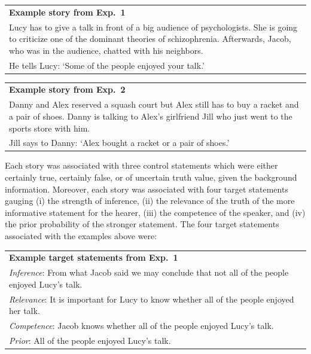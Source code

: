 \documentclass[12pt]{article}
\begin{document}
\begin{center}
\begin{tabular}{p{10cm}}
\textbf{Example story from Exp.\ 1} \\
  Lucy has to give a talk in front of a big audience of psychologists. She is going to criticize one of the dominant theories of schizophrenia. Afterwards, Jacob, who was in the audience, chatted with his neighbors.\\[.2cm]
  He tells Lucy: `Some of the people enjoyed your talk.'
\end{tabular}
\end{center}


\begin{center}
\begin{tabular}{p{10cm}}
\textbf{Example story from Exp.\ 2} \\
  Danny and Alex reserved a squash court but Alex still has to buy a racket and a pair of
  shoes. Danny is talking to Alex's girlfriend Jill who just went to the sports store with
  him.\\[.2cm]
  Jill says to Danny: `Alex bought a racket or a pair of shoes.'
\end{tabular}
\end{center}

\noindent Each story was associated with three control statements which were either
certainly true, certainly false, or of uncertain truth value, given the background
information. Moreover, each story was associated with four target statements gauging (i) the strength of inference, (ii) the relevance of the truth of the more informative statement for the hearer, (iii) the competence of the speaker, and (iv) the prior probability of the stronger statement. The four target statements associated with the examples above were:

\begin{center}
\begin{tabular}{p{10cm}}
\textbf{Example target statements from Exp.\ 1} \\[.2cm]
\emph{Inference}: From what Jacob said we may conclude that not all of the people enjoyed Lucy's talk.\\[.1cm]
\emph{Relevance}: It is important for Lucy to know whether all of the people enjoyed her talk.\\[.1cm]
  \emph{Competence}: Jacob knows whether all of the people enjoyed Lucy's talk. \\[.1cm]
  \emph{Prior}: All of the people enjoyed Lucy's talk.
\end{tabular}
\end{center}
\end{document}
